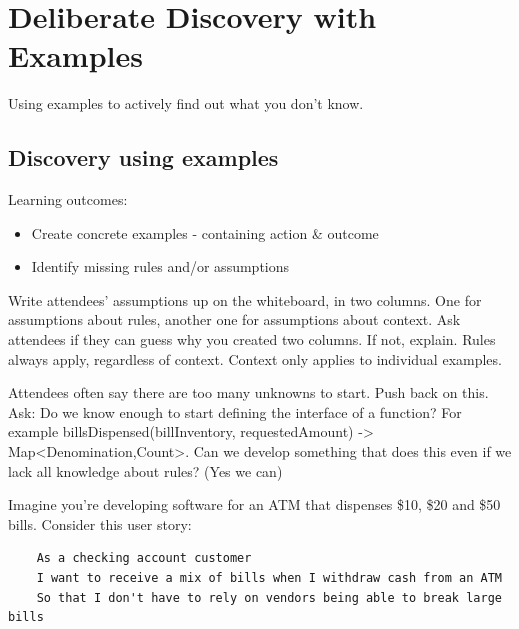 \chapter*{Deliberate Discovery with Examples}

\ifcontent

    Using examples to actively find out what you don't know.

\fi 

\section*{Discovery using examples}

\ifnotes

    Learning outcomes:
    
    \begin{itemize}
        \item Create concrete examples - containing action \& outcome
        \item Identify missing rules and/or assumptions
    \end{itemize}

    Write attendees' assumptions up on the whiteboard, in two columns. One for assumptions about rules, another one for assumptions about context. Ask attendees if they can guess why you created two columns. If not, explain. Rules always apply, regardless of context. Context only applies to individual examples.
    
    Attendees often say there are too many unknowns to start. Push back on this. Ask: Do we know enough to start defining the interface of a function? For example billsDispensed(billInventory, requestedAmount) -> Map<Denomination,Count>. Can we develop something that does this even if we lack all knowledge about rules? (Yes we can)
    
\fi

\ifcontent

    Imagine you're developing software for an ATM that dispenses \$10, \$20 and \$50 bills. Consider this user story:
    
    
    \begin{center}
    \begin{varwidth}{\columnwidth}
    \begin{verbatim}
    As a checking account customer
    I want to receive a mix of bills when I withdraw cash from an ATM
    So that I don't have to rely on vendors being able to break large bills
    \end{verbatim}
    \end{varwidth}
    \end{center}
    
